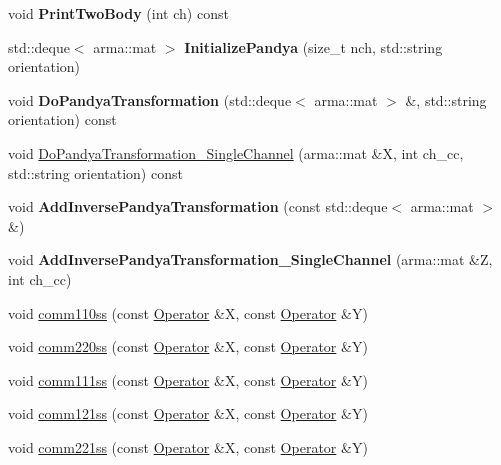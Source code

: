 \begin{DoxyCompactItemize}
\item 
\mbox{\label{classOperator_a06bd0f886c26e922cb3b301ba4a363b9}} 
void {\bfseries Print\+Two\+Body} (int ch) const
\item 
\mbox{\label{classOperator_abb23fea0e678a61b99af1a5a37d032ee}} 
std\+::deque$<$ arma\+::mat $>$ {\bfseries Initialize\+Pandya} (size\+\_\+t nch, std\+::string orientation)
\item 
\mbox{\label{classOperator_ae65125169adefa8ee52cc84be1b35aa8}} 
void {\bfseries Do\+Pandya\+Transformation} (std\+::deque$<$ arma\+::mat $>$ \&, std\+::string orientation) const
\item 
void \hyperlink{classOperator_a55361c46e22f6e7c3d62d8821a8f08c8}{Do\+Pandya\+Transformation\+\_\+\+Single\+Channel} (arma\+::mat \&X, int ch\+\_\+cc, std\+::string orientation) const
\item 
\mbox{\label{classOperator_a45d9a9a2499ffd54c743206b8ff1d2d3}} 
void {\bfseries Add\+Inverse\+Pandya\+Transformation} (const std\+::deque$<$ arma\+::mat $>$ \&)
\item 
\mbox{\label{classOperator_a43d04939bd982e2a4323044dfe24023a}} 
void {\bfseries Add\+Inverse\+Pandya\+Transformation\+\_\+\+Single\+Channel} (arma\+::mat \&Z, int ch\+\_\+cc)
\item 
void \hyperlink{classOperator_a39adf2f2f225609606da088b59e3502a}{comm110ss} (const \hyperlink{classOperator}{Operator} \&X, const \hyperlink{classOperator}{Operator} \&Y)
\item 
void \hyperlink{classOperator_a8ea2254b8012c53ff6063a90ab7a5796}{comm220ss} (const \hyperlink{classOperator}{Operator} \&X, const \hyperlink{classOperator}{Operator} \&Y)
\item 
void \hyperlink{classOperator_ae22e28ebda5b170f2cdc4d2d9462971a}{comm111ss} (const \hyperlink{classOperator}{Operator} \&X, const \hyperlink{classOperator}{Operator} \&Y)
\item 
void \hyperlink{classOperator_af80e0152e9dffb0194b8b26c5d75d815}{comm121ss} (const \hyperlink{classOperator}{Operator} \&X, const \hyperlink{classOperator}{Operator} \&Y)
\item 
void \hyperlink{classOperator_abd2096925a9b0028ee988255955b907f}{comm221ss} (const \hyperlink{classOperator}{Operator} \&X, const \hyperlink{classOperator}{Operator} \&Y)

\end{DoxyCompactItemize}
